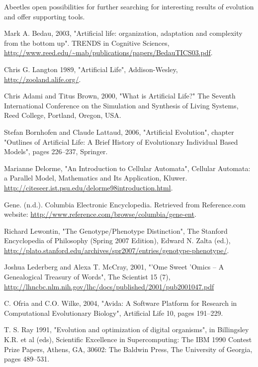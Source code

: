 \documentclass[a4paper,12pt]{report}
\begin{document}
Abeetles open possibilities for further searching for interesting results of evolution and offer supporting tools.


\begin{thebibliography}{99}

Mark A. Bedau, 2003, "Artificial life: organization, adaptation and complexity from the bottom up". TRENDS in Cognitive Sciences, \url{http://www.reed.edu/~mab/publications/papers/BedauTICS03.pdf}.

Chris G. Langton 1989,  "Artificial Life", Addison-Wesley, \url{http://zooland.alife.org/}.

Chris Adami and Titus Brown, 2000, "What is Artificial Life?" The Seventh International Conference on the Simulation and Synthesis of Living Systems, Reed College, Portland, Oregon, USA.

Stefan Bornhofen and Claude Lattaud, 2006, "Artificial Evolution", chapter "Outlines of Artificial Life: A Brief History of Evolutionary Individual Based Models", pages 226--237, Springer.

Marianne Delorme, "An Introduction to Cellular Automata", Cellular Automata: a Parallel Model, Mathematics and Its Application, Kluwer. \url{http://citeseer.ist.psu.edu/delorme98introduction.html}. 

Gene. (n.d.). Columbia Electronic Encyclopedia. Retrieved from Reference.com website: \url{http://www.reference.com/browse/columbia/gene-ent}.

Richard Lewontin, "The Genotype/Phenotype Distinction", The Stanford Encyclopedia of Philosophy (Spring 2007 Edition), Edward N. Zalta (ed.), \url{http://plato.stanford.edu/archives/spr2007/entries/genotype-phenotype/}.

Joshua Lederberg and Alexa T. McCray, 2001, "'Ome Sweet 'Omics -- A Genealogical Treasury of Words", The Scientist 15 (7), \url{http://lhncbc.nlm.nih.gov/lhc/docs/published/2001/pub2001047.pdf}

C. Ofria and C.O. Wilke, 2004, "Avida: A Software Platform for Research in Computational Evolutionary Biology", Artificial Life 10, pages 191--229.

T. S. Ray 1991, "Evolution and optimization of digital organisms", in Billingsley K.R. et al (eds), Scientific Excellence in Supercomputing: The IBM 1990 Contest Prize Papers, Athens, GA, 30602: The Baldwin Press, The University of Georgia, pages 489--531.


\end{thebibliography}
\end{document}
